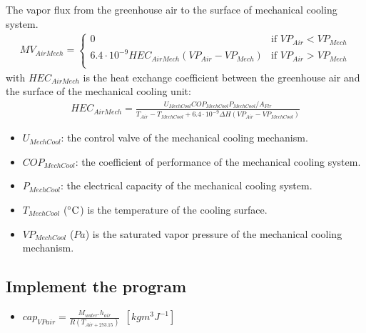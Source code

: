 \documentclass[a4paper]{article}
\numberwithin{equation}{section}
\begin{document}
The vapor flux from the greenhouse air to the surface of mechanical cooling system.
\begin{align*}
  MV_{AirMech} = \begin{cases}
    0                                                     & \text{if~} VP_{Air} < VP_{Mech} \\
    6.4 \cdot 10^{-9} HEC_{AirMech}(VP_{Air} - VP_{Mech}) & \text{if~} VP_{Air} > VP_{Mech} \\
  \end{cases}
\end{align*}
with \(HEC_{AirMech}\) is the heat exchange coefficient between the greenhouse air and the surface of the mechanical cooling unit:
\begin{align*}
  HEC_{AirMech} = \frac{U_{MechCool} COP_{MechCool} P_{MechCool} / A_{Flr}}{T_{Air} - T_{MechCool} + 6.4 \cdot 10^{-9} \Delta H(VP_{Air} - VP_{MechCool})}
\end{align*}
\begin{itemize}
    \item \(U_{MechCool}\): the control valve of the mechanical cooling mechanism.
    \item \(COP_{MechCool}\): the coefficient of performance of the mechanical cooling system.
    \item \(P_{MechCool}\): the electrical capacity of the mechanical cooling system.
    \item \(T_{MechCool}\) (\(\celsius\)) is the temperature of the cooling surface.
    \item \(VP_{MechCool}\) (\(Pa\)) is the saturated vapor pressure of the mechanical cooling mechanism.
\end{itemize}
\subsection{Implement the program}

\begin{itemize}
    \item   $cap_{VPair} = \frac{M_{water}.h_{air}}{R(T_{Air+273.15})} ~~[kgm^3J^{-1}]$
\end{itemize}
\end{document}
